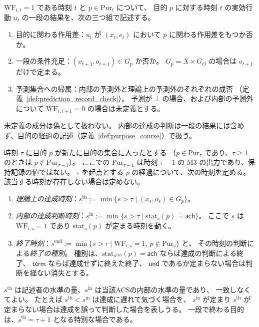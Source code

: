 \begin{definition}
\label{def:result_tuple}
$\mathrm{WF}_{i,t}=1$ である時刻 $t$ と $p\in\mathrm{Pur}_t$ について、
目的 $p$ に対する時刻 $t$ の実効行動 $u_t$ の一段の結果を、次の三つ組で記述する。
\begin{enumerate}[label=(\roman*)]
  \item 目的に関わる作用差：$u_t$ が $(x_t,e_t)$ において $p$ に関わる作用差をもつか否か。
  \item 一段の条件充足：$(x_{t+1},o_{t+1})\in G_p$ か否か。
  $G_p=X\times G_O$ の場合は $o_{t+1}$ だけで定まる。
  \item 予測集合への帰属：内部の予測外と理論上の予測外のそれぞれの成否
  （定義~\ref{def:prediction_record_check}）。
  予測が $\bot$ の場合、および内部の予測外について $\mathrm{WF}_{i,t+1}=0$ の場合は未定義とする。
\end{enumerate}
未定義の成分は偽として扱わない。
内部の達成の判断は一段の結果には含めず、目的の経過の記述（定義~\ref{def:purpose_course}）で扱う。
\end{definition}

\begin{definition}
\label{def:purpose_course}
時刻 $\tau$ に目的 $p$ が新たに目的の集合に入ったとする
（$p\in\mathrm{Pur}_{\tau}$ であり、$\tau\geq1$ のときは $p\notin\mathrm{Pur}_{\tau-1}$）。
ここでの $\mathrm{Pur}_{\tau-1}$ は時刻 $\tau-1$ の M3 の出力であり、保持記録の値ではない。
$\tau$ を起点とする $p$ の経過について、次の時刻を定める。
該当する時刻が存在しない場合は定めない。
\begin{enumerate}[label=(\roman*)]
  \item \emph{理論上の達成時刻}：$s^{\mathrm{th}}:=\min\{s>\tau\mid (x_s,o_s)\in G_p\}$。
  \item \emph{内部の達成判断時刻}：$s^{\mathrm{in}}:=\min\{s>\tau\mid \mathrm{stat}_s(p)=\mathsf{ach}\}$。
  ここで $s$ は $\mathrm{WF}_{i,s}=1$ であり $\mathrm{stat}_s(p)$ が定まる時刻を動く。
  \item \emph{終了時刻}：$s^{\mathrm{end}}:=\min\{s>\tau\mid \mathrm{WF}_{i,s}=1,\ p\notin\mathrm{Pur}_s\}$ と、
  その時刻の判断による\emph{終了の種別}。
  種別は、$\mathrm{stat}_{s^{\mathrm{end}}}(p)=\mathsf{ach}$ ならば達成の判断による終了、
  $\mathsf{term}$ ならば達成せずに終えた終了、
  $\mathsf{und}$ であるか定まらない場合は判断を経ない消失とする。
\end{enumerate}
$s^{\mathrm{th}}$ は記述者の水準の量、$s^{\mathrm{in}}$ は当該ACSの内部の水準の量であり、
一致しなくてよい。
たとえば $s^{\mathrm{th}}<s^{\mathrm{in}}$ は達成に遅れて気づく場合を、
$s^{\mathrm{in}}$ が定まり $s^{\mathrm{th}}$ が定まらない場合は達成を誤って判断した場合を表しうる。
一段で終わる目的は、$s^{\mathrm{th}}=\tau+1$ となる特別な場合である。
\end{definition}


